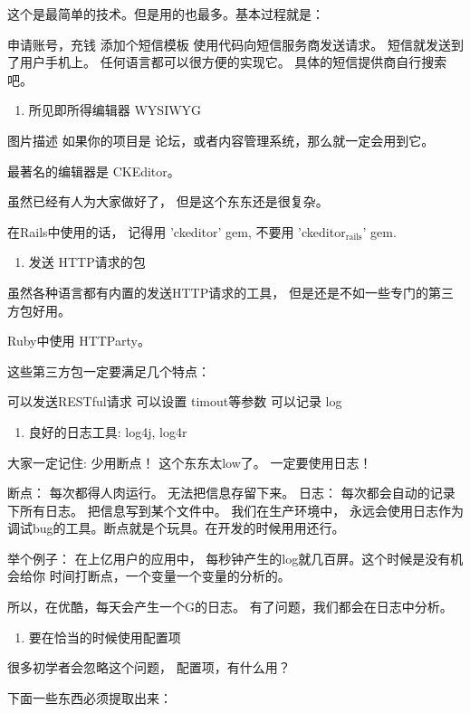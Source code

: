 \documentclass[11pt]{ctexart}
\begin{document}
{{{{这个是最简单的技术。但是用的也最多。基本过程就是：

申请账号，充钱
添加个短信模板
使用代码向短信服务商发送请求。
短信就发送到了用户手机上。
任何语言都可以很方便的实现它。 具体的短信提供商自行搜索吧。

\begin{enumerate}
\item 所见即所得编辑器 WYSIWYG
\end{enumerate}

图片描述
如果你的项目是 论坛，或者内容管理系统，那么就一定会用到它。

最著名的编辑器是 CKEditor。

虽然已经有人为大家做好了， 但是这个东东还是很复杂。

在Rails中使用的话， 记得用 'ckeditor' gem, 不要用 'ckeditor\(_{\text{rails}}\)' gem.

\begin{enumerate}
\item 发送 HTTP请求的包
\end{enumerate}

虽然各种语言都有内置的发送HTTP请求的工具， 但是还是不如一些专门的第三方包好用。

Ruby中使用 HTTParty。

这些第三方包一定要满足几个特点：

可以发送RESTful请求
可以设置 timout等参数
可以记录 log
\begin{enumerate}
\item 良好的日志工具: log4j, log4r
\end{enumerate}

大家一定记住: 少用断点！ 这个东东太low了。
一定要使用日志！

断点： 每次都得人肉运行。 无法把信息存留下来。
日志： 每次都会自动的记录下所有日志。 把信息写到某个文件中。
我们在生产环境中， 永远会使用日志作为调试bug的工具。断点就是个玩具。在开发的时候用用还行。

举个例子： 在上亿用户的应用中， 每秒钟产生的log就几百屏。这个时候是没有机会给你
时间打断点，一个变量一个变量的分析的。


所以，在优酷，每天会产生一个G的日志。 有了问题，我们都会在日志中分析。

\begin{enumerate}
\item 要在恰当的时候使用配置项
\end{enumerate}

很多初学者会忽略这个问题， 配置项，有什么用？

下面一些东西必须提取出来：

}}}}
\end{document}
